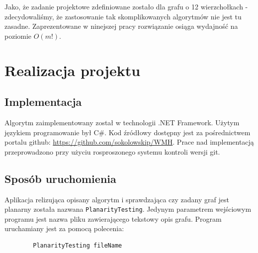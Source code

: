\documentclass[a4 122pt]{article}
\begin{document}
		Jako, że zadanie projektowe zdefiniowane zostało dla grafu o 12 wierzchołkach - zdecydowaliśmy, że zastosowanie tak skomplikowanych algorytmów nie jest tu zasadne. 
		Zaprezentowane w ninejszej pracy rozwiązanie osiąga wydajność na poziomie $O(m!)$.

	\pagebreak
	
\section{Realizacja projektu}

		
	\subsection{Implementacja}

		Algorytm zaimplementowany został w technologii .NET Framework. Użytym językiem programowanie był C\#.
		Kod źródłowy dostępny jest za pośrednictwem portalu github: \url{https://github.com/sokolowskip/WMH}.
		Prace nad implementacją przeprowadzono przy użyciu rosproszonego systemu kontroli wersji git.

	\subsection{Sposób uruchomienia}
	
		Aplikacja relizująca opisany algorytm i sprawdzająca czy zadany graf jest planarny została nazwana \texttt{PlanarityTesting}. 
		Jedynym parametrem wejściowym programu jest nazwa pliku zawierającego tekstowy opis grafu. Program uruchamiany jest za pomocą polecenia:
		\begin{verbatim}
		PlanarityTesting fileName
		\end{verbatim}
\end{document}
